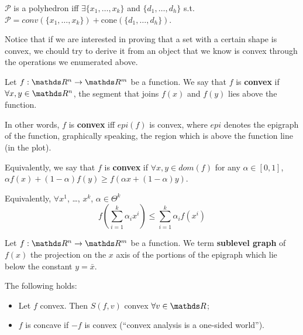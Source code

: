 \documentclass[computationalMathematics.tex]{subfiles}
\begin{document}
\begin{theorem}
  $\mathcal{P}$ is a polyhedron iff $\exists \{x_1, \ldots, x_k\}$ and $\{d_1, \ldots, d_h\}$ s.t. $\mathcal{P} = conv(\{x_1, \ldots, x_k\}) + \text{cone}(\{d_1, \ldots, d_h\})$.
\end{theorem}

Notice that if we are interested in proving that a set with a certain shape is convex, we chould try to derive it from an object that we know is convex through the operations we enumerated above.

\begin{definition}
  Let $f:\R^n \to \R^m$ be a function. We say that $f$ is \textbf{convex} if $\forall x, y \in \R^n$, the segment that joins $f(x)$ and $f(y)$ lies above the function.

  In other words, $f$ is \textbf{convex} iff $epi(f)$ is convex, where $epi$ denotes the epigraph of the function, graphically speaking, the region which is above the function line (in the plot).

  Equivalently, we say that $f$ is \textbf{convex} if $\forall x, y \in dom(f)$ for any $\alpha \in [0, 1]$, $\alpha f(x) + (1-\alpha) f(y) \geq f(\alpha x + (1-\alpha)y)$.

  Equivalently, $\forall x^1$, \ldots, $x^k$, $\alpha \in \Theta^k$
\[
 f \left( \sum_{i=1}^k \alpha_i x^i \right) \leq \sum_{i=1}^k \alpha_i f(x^i)
\]
\end{definition}

\begin{definition}
  Let $f: \R^n \to \R^m$ be a function. We term \textbf{sublevel graph} of $f(x)$ the projection on the $x$ axis of the portions of the epigraph which lie below the constant $y=\bar{x}$.
\end{definition}


\begin{proposition}\label{prop:5ott_1}
The following holds:
\begin{itemize}
 \item Let $f$ convex. Then $S(f,v)$ convex $\forall v \in \R$;
 \item $f$ is concave if $-f$ is convex (``convex analysis is a one-sided world'').
\end{itemize}
\end{proposition}
\end{document}
